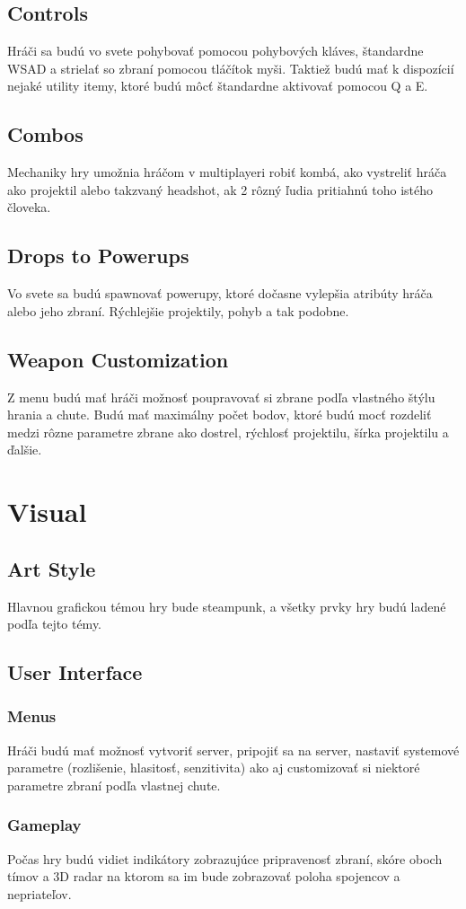 \documentclass[a4paper]{report}
\begin{document}
\section{Controls}
Hráči sa budú vo svete pohybovať pomocou pohybových kláves, štandardne WSAD a strielať so zbraní pomocou tláčítok myši. Taktiež budú mať k dispozícií nejaké utility itemy, ktoré budú môcť štandardne aktivovať pomocou Q a E.

\section{Combos}
Mechaniky hry umožnia hráčom v multiplayeri robiť kombá, ako vystreliť hráča ako projektil alebo takzvaný headshot, ak 2 rôzný ľudia pritiahnú toho istého človeka.

\section{Drops to Powerups}
Vo svete sa budú spawnovať powerupy, ktoré dočasne vylepšia atribúty hráča alebo jeho zbraní. Rýchlejšie projektily, pohyb a tak podobne.

\section{Weapon Customization}
Z menu budú mať hráči možnosť poupravovať si zbrane podľa vlastného štýlu hrania a chute. Budú mať maximálny počet bodov, ktoré budú mocť rozdeliť medzi rôzne parametre zbrane ako dostrel, rýchlosť projektilu, šírka projektilu a ďalšie.
 
\chapter{Visual}
\section{Art Style}
Hlavnou grafickou témou hry bude steampunk, a všetky prvky hry budú ladené podľa tejto témy.
 
\section{User Interface}
\subsection{Menus}
Hráči budú mať možnosť vytvoriť server, pripojiť sa na server, nastaviť systemové parametre (rozlišenie, hlasitosť, senzitivita) ako aj customizovať si niektoré parametre zbraní podľa vlastnej chute.
 
\subsection{Gameplay}
Počas hry budú vidiet indikátory zobrazujúce pripravenosť zbraní, skóre oboch tímov a 3D radar na ktorom sa im bude zobrazovať poloha spojencov a nepriateľov.
 
\end{document}
